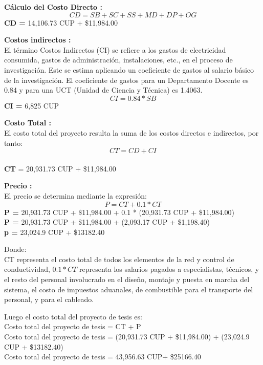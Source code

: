 \textbf{Cálculo del Costo Directo :}\\
\begin{equation}
    CD = SB + SC + SS + MD + DP + OG
\end{equation}
\textbf{CD =} 14,106.73  CUP + \$11,984.00

\textbf{Costos indirectos :}\\
El término Costos Indirectos (CI) se refiere a los gastos de electricidad consumida, gastos de administración,
instalaciones, etc., en el proceso de investigación. Este se estima aplicando un coeficiente de gastos al
salario básico de la investigación. El coeficiente de gastos para un Departamento Docente es 0.84 y para una
UCT (Unidad de Ciencia y Técnica) es 1.4063.
\begin{equation}
    CI = 0.84 * SB
\end{equation}
\textbf{CI =} 6,825 CUP

\textbf{Costo Total :}\\
El costo total del proyecto resulta la suma de los costos directos e indirectos, por tanto:
\begin{equation}
    CT = CD + CI
\end{equation}\\
\textbf{CT} = 20,931.73 CUP + \$11,984.00

\textbf{Precio :}\\
El precio se determina mediante la expresión:
\begin{equation}
    P = CT + 0.1 * CT
\end{equation}
\textbf{P =} 20,931.73 CUP + \$11,984.00 + 0.1 * (20,931.73 CUP + \$11,984.00)\\
\textbf{P =} 20,931.73 CUP + \$11,984.00 +  (2,093.17 CUP + \$1,198.40)\\
\textbf{p =} 23,024.9 CUP + \$13182.40

Donde:\\
CT representa el costo total de todos los elementos de la red y control de conductividad, $0.1*CT$
representa los salarios pagados a especialistas, técnicos, y el resto del personal involucrado en el diseño,
montaje y puesta en marcha del sistema, el costo de impuestos aduanales, de combustible para el transporte del
personal, y para el cableado.

Luego el costo total del proyecto de tesis es:\\
Costo total del proyecto de tesis = CT + P                                                   \\
Costo total del proyecto de tesis = (20,931.73 CUP + \$11,984.00) + (23,024.9 CUP + \$13182.40) \\
Costo total del proyecto de tesis = 43,956.63 CUP+ \$25166.40

